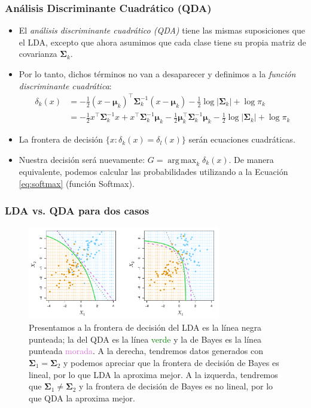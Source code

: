 \documentclass[usenames,dvipsnames]{beamer} %
\DeclareMathOperator*{\argmax}{arg\,max}
\newcommand\defi[1]{\textcolor{NavyBlue}{\textit{#1}}}
\begin{document}
\begin{frame}\frametitle{An\'alisis Discriminante Cuadr\'atico (QDA)}
\begin{itemize}
	\item El \defi{an\'alisis discriminante cuadr\'atico (QDA)} tiene las mismas suposiciones que el LDA, excepto que ahora asumimos que cada clase tiene su propia matriz de covarianza $\bm \Sigma_k$.
	\item Por lo tanto, dichos t\'erminos no van a desaparecer y definimos a la \defi{funci\'on discriminante cuadr\'atica}:
	\begin{equation}\label{eq:islr_4-23}
	\begin{aligned}
	\delta_k(x) &= -\frac{1}{2}(x-\bm{\mu}_{k})^{\top} \bm{\Sigma}_k^{-1}(x-\bm{\mu}_k) - \frac{1}{2}\log{|\bm \Sigma_k|} + \log{\pi_k}\\
	&= -\frac{1}{2} x^{\top}\bm{\Sigma}_k^{-1} x + x^{\top}\bm{\Sigma}_k^{-1} \bm \mu_k - \frac{1}{2}\bm \mu_k^{\top}\bm{\Sigma}_k^{-1}\bm \mu_k- \frac{1}{2}\log{|\bm \Sigma_k|} + \log{\pi_k}
	\end{aligned}
	\end{equation}
	\item La frontera de decisi\'on $\{x:\delta_k(x) = \delta_l(x) \}$ ser\'an ecuaciones cuadr\'aticas.
	\item Nuestra decisi\'on ser\'a nuevamente: $G=\argmax_k \delta_k(x)$. De manera equivalente, podemos calcular las probabilidades utilizando a la Ecuaci\'on \ref{eq:softmax} (funci\'on Softmax).
\end{itemize}
\end{frame}

\begin{frame}\frametitle{LDA vs. QDA para dos casos}
\begin{figure}
	\centering
	\includegraphics[width=0.75\textwidth]{images/islr/fig_4_9.png}
	\caption{Presentamos a la frontera de decisi\'on del LDA es la l\'inea negra punteada; la del QDA es la l\'inea \textcolor{green}{verde} y la de Bayes es la l\'inea punteada \textcolor{Orchid}{morada}. A la derecha, tendremos datos generados con $\bm \Sigma_1 = \bm \Sigma_2$ y podemos apreciar que la frontera de decisi\'on de Bayes es lineal, por lo que LDA la aproxima mejor. A la izquerda, tendremos que $\bm \Sigma_1 \neq \bm \Sigma_2$ y la frontera de decisi\'on de Bayes es no lineal, por lo que QDA la aproxima mejor.}
	\label{}
\end{figure}
\end{frame}
\end{document}
